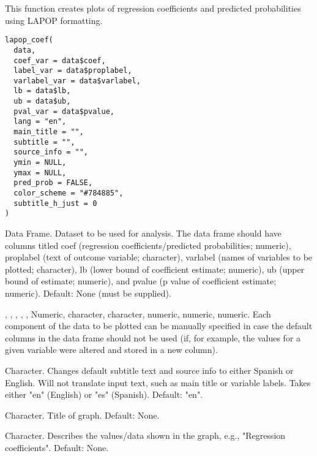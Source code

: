 \documentclass[a4paper]{book}
\begin{document}
%
\begin{Description}
This function creates plots of regression coefficients and predicted probabilities using LAPOP formatting.
\end{Description}
%
\begin{Usage}
\begin{verbatim}
lapop_coef(
  data,
  coef_var = data$coef,
  label_var = data$proplabel,
  varlabel_var = data$varlabel,
  lb = data$lb,
  ub = data$ub,
  pval_var = data$pvalue,
  lang = "en",
  main_title = "",
  subtitle = "",
  source_info = "",
  ymin = NULL,
  ymax = NULL,
  pred_prob = FALSE,
  color_scheme = "#784885",
  subtitle_h_just = 0
)
\end{verbatim}
\end{Usage}
%
\begin{Arguments}
\begin{ldescription}
\item[\code{data}] Data Frame. Dataset to be used for analysis.  The data frame should have columns
titled coef (regression coefficients/predicted probabilities; numeric), proplabel (text of outcome variable; character),
varlabel (names of variables to be plotted; character), lb (lower bound of coefficient estimate; numeric),
ub (upper bound of estimate; numeric), and pvalue (p value of coefficient estimate; numeric).
Default: None (must be supplied).

\item[\code{coef\_var}, \code{label\_var}, \code{varlabel\_var}, \code{lb}, \code{ub}, \code{pval\_var}] Numeric, character, character, numeric,
numeric, numeric. Each component of the data to be plotted can be manually specified in case
the default columns in the data frame should not be used (if, for example, the values for a given
variable were altered and stored in a new column).

\item[\code{lang}] Character.  Changes default subtitle text and source info to either Spanish or English.
Will not translate input text, such as main title or variable labels.  Takes either "en" (English)
or "es" (Spanish).  Default: "en".

\item[\code{main\_title}] Character.  Title of graph.  Default: None.

\item[\code{subtitle}] Character.  Describes the values/data shown in the graph, e.g., "Regression coefficients".
Default: None.


\end{ldescription}
\end{Arguments}
\end{document}

